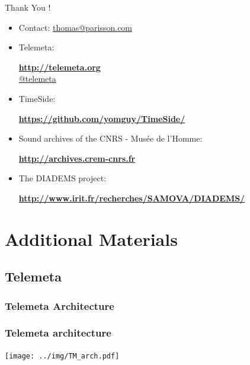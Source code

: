 \documentclass[final, hyperref, table]{beamer}
\begin{document}
\begin{frame}
  Thank You !\\
  \begin{itemize}
  \item Contact: \url{thomas@parisson.com}
  \item Telemeta:
    \begin{center}
      \colorbox{yellow!40}{\textbf{\url{http://telemeta.org}}}\\
      \colorbox{yellow!40}{\href{https://twitter.com/telemeta/}{@telemeta}}
    \end{center}

  \item TimeSide:
    \begin{center}
      \colorbox{yellow!40}{\bf
        \url{https://github.com/yomguy/TimeSide/}}
    \end{center}

  \item Sound archives of the CNRS - Musée de l’Homme:
    \begin{center}
      \colorbox{yellow!40}{\bf\url{http://archives.crem-cnrs.fr}}
    \end{center}

  \item The DIADEMS project:
    \begin{center}
      \colorbox{yellow!40}{\bf
        \url{http://www.irit.fr/recherches/SAMOVA/DIADEMS/}}
    \end{center}

  \end{itemize}

\end{frame}

\appendix
\section{Additional Materials}
\subsection{Telemeta}
\subsubsection{Telemeta Architecture}
\begin{frame}\frametitle{Telemeta architecture}
  \begin{center}
    \texttt{[image: ../img/TM\_arch.pdf]}
  \end{center}
\end{frame}
\end{document}
